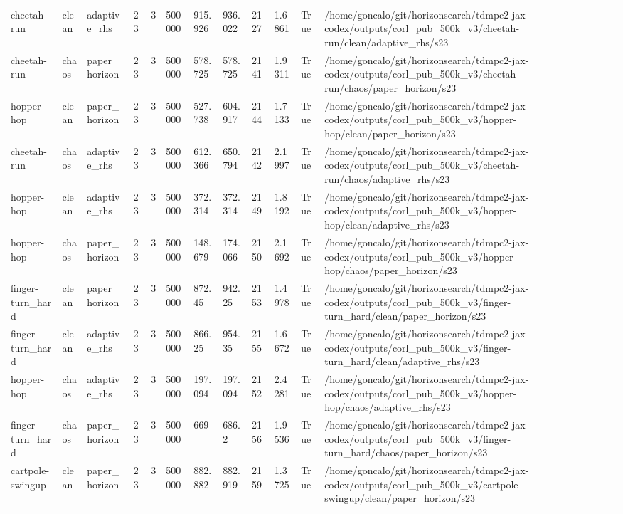 \begin{tabular}{llllllllllll}
cheetah-run & clean & adaptive\_rhs & 23 & 3 & 500000 & 915.926 & 936.022 & 2127 & 1.6861 & True & /home/goncalo/git/horizonsearch/tdmpc2-jax-codex/outputs/corl\_pub\_500k\_v3/cheetah-run/clean/adaptive\_rhs/s23 \\
cheetah-run & chaos & paper\_horizon & 23 & 3 & 500000 & 578.725 & 578.725 & 2141 & 1.9311 & True & /home/goncalo/git/horizonsearch/tdmpc2-jax-codex/outputs/corl\_pub\_500k\_v3/cheetah-run/chaos/paper\_horizon/s23 \\
hopper-hop & clean & paper\_horizon & 23 & 3 & 500000 & 527.738 & 604.917 & 2144 & 1.7133 & True & /home/goncalo/git/horizonsearch/tdmpc2-jax-codex/outputs/corl\_pub\_500k\_v3/hopper-hop/clean/paper\_horizon/s23 \\
cheetah-run & chaos & adaptive\_rhs & 23 & 3 & 500000 & 612.366 & 650.794 & 2142 & 2.1997 & True & /home/goncalo/git/horizonsearch/tdmpc2-jax-codex/outputs/corl\_pub\_500k\_v3/cheetah-run/chaos/adaptive\_rhs/s23 \\
hopper-hop & clean & adaptive\_rhs & 23 & 3 & 500000 & 372.314 & 372.314 & 2149 & 1.8192 & True & /home/goncalo/git/horizonsearch/tdmpc2-jax-codex/outputs/corl\_pub\_500k\_v3/hopper-hop/clean/adaptive\_rhs/s23 \\
hopper-hop & chaos & paper\_horizon & 23 & 3 & 500000 & 148.679 & 174.066 & 2150 & 2.1692 & True & /home/goncalo/git/horizonsearch/tdmpc2-jax-codex/outputs/corl\_pub\_500k\_v3/hopper-hop/chaos/paper\_horizon/s23 \\
finger-turn\_hard & clean & paper\_horizon & 23 & 3 & 500000 & 872.45 & 942.25 & 2153 & 1.4978 & True & /home/goncalo/git/horizonsearch/tdmpc2-jax-codex/outputs/corl\_pub\_500k\_v3/finger-turn\_hard/clean/paper\_horizon/s23 \\
finger-turn\_hard & clean & adaptive\_rhs & 23 & 3 & 500000 & 866.25 & 954.35 & 2155 & 1.6672 & True & /home/goncalo/git/horizonsearch/tdmpc2-jax-codex/outputs/corl\_pub\_500k\_v3/finger-turn\_hard/clean/adaptive\_rhs/s23 \\
hopper-hop & chaos & adaptive\_rhs & 23 & 3 & 500000 & 197.094 & 197.094 & 2152 & 2.4281 & True & /home/goncalo/git/horizonsearch/tdmpc2-jax-codex/outputs/corl\_pub\_500k\_v3/hopper-hop/chaos/adaptive\_rhs/s23 \\
finger-turn\_hard & chaos & paper\_horizon & 23 & 3 & 500000 & 669 & 686.2 & 2156 & 1.9536 & True & /home/goncalo/git/horizonsearch/tdmpc2-jax-codex/outputs/corl\_pub\_500k\_v3/finger-turn\_hard/chaos/paper\_horizon/s23 \\
cartpole-swingup & clean & paper\_horizon & 23 & 3 & 500000 & 882.882 & 882.919 & 2159 & 1.3725 & True & /home/goncalo/git/horizonsearch/tdmpc2-jax-codex/outputs/corl\_pub\_500k\_v3/cartpole-swingup/clean/paper\_horizon/s23 \\

\end{tabular}

